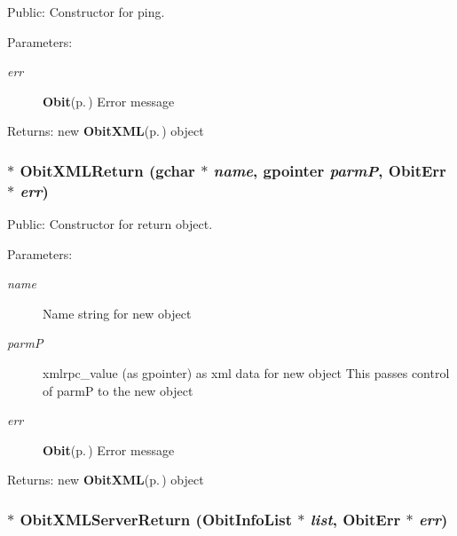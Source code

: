 Public: Constructor for ping. 

\begin{Desc}
\item[Parameters:]
\begin{description}
\item[{\em err}]{\bf Obit}{\rm (p.\,\pageref{structObit})} Error message \end{description}
\end{Desc}
\begin{Desc}
\item[Returns:]new {\bf Obit\-XML}{\rm (p.\,\pageref{structObitXML})} object \end{Desc}
\subsubsection{$\ast$ Obit\-XMLReturn (gchar $\ast$ {\em name}, gpointer {\em parm\-P}, {\bf Obit\-Err} $\ast$ {\em err})}\label{ObitXML_8c_a25}


Public: Constructor for return object. 

\begin{Desc}
\item[Parameters:]
\begin{description}
\item[{\em name}]Name string for new object \item[{\em parm\-P}]xmlrpc\_\-value (as gpointer) as xml data for new object This passes control of parm\-P to the new object \item[{\em err}]{\bf Obit}{\rm (p.\,\pageref{structObit})} Error message \end{description}
\end{Desc}
\begin{Desc}
\item[Returns:]new {\bf Obit\-XML}{\rm (p.\,\pageref{structObitXML})} object \end{Desc}
\subsubsection{$\ast$ Obit\-XMLServer\-Return ({\bf Obit\-Info\-List} $\ast$ {\em list}, {\bf Obit\-Err} $\ast$ {\em err})}\label{ObitXML_8c_a26}


